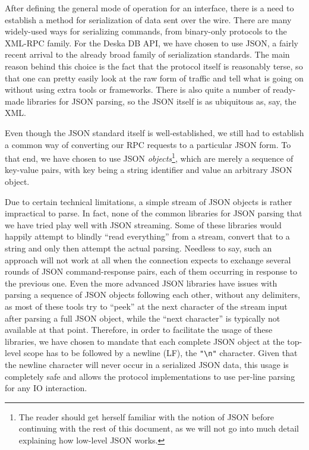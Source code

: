 \documentclass{article}
\begin{document}
After defining the general mode of operation for an interface, there is a need to establish a method for serialization
of data sent over the wire.  There are many widely-used ways for serializing commands, from binary-only protocols to the
XML-RPC family.  For the Deska DB API, we have chosen to use JSON, a fairly recent arrival to the already broad family
of serialization standards.  The main reason behind this choice is the fact that the protocol itself is reasonably
terse, so that one can pretty easily look at the raw form of traffic and tell what is going on without using extra tools
or frameworks.  There is also quite a number of ready-made libraries for JSON parsing, so the JSON itself is as
ubiquitous as, say, the XML.

Even though the JSON standard itself is well-established, we still had to establish a common way of converting our RPC
requests to a particular JSON form. To that end, we have chosen to use JSON {\em objects}\footnote{The reader should get
herself familiar with the notion of JSON before continuing with the rest of this document, as we will not go into much
detail explaining how low-level JSON works.}, which are merely a sequence of key-value pairs, with key being a string
identifier and value an arbitrary JSON object.  

Due to certain technical limitations, a simple stream of JSON objects is rather impractical to parse.  In fact, none of
the common libraries for JSON parsing that we have tried play well with JSON streaming.  Some of these libraries would
happily attempt to blindly ``read everything'' from a stream, convert that to a string and only then attempt the actual
parsing.  Needless to say, such an approach will not work at all when the connection expects to exchange several rounds
of JSON command-response pairs, each of them occurring in response to the previous one.  Even the more advanced JSON
libraries have issues with parsing a sequence of JSON objects following each other, without any delimiters, as most of
these tools try to ``peek'' at the next character of the stream input after parsing a full JSON object, while the ``next
character'' is typically not available at that point.  Therefore, in order to facilitate the usage of these libraries,
we have chosen to mandate that each complete JSON object at the top-level scope has to be followed by a newline (LF),
the {\tt "\textbackslash n"} character.  Given that the newline character will never occur in a serialized JSON data,
this usage is completely safe and allows the protocol implementations to use per-line parsing for any IO interaction.
\end{document}
